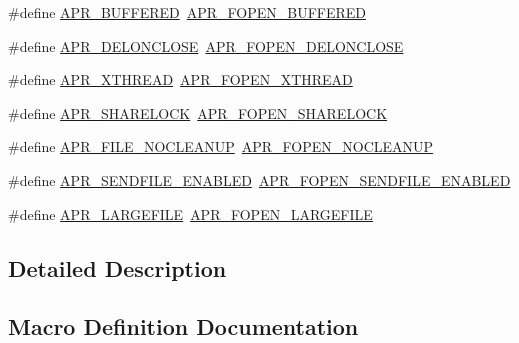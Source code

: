 \begin{DoxyCompactItemize}
\item 
\#define \hyperlink{group__apr__file__open__flags_ga6edc818199e8b90e3dabf97c42a27158}{A\+P\+R\+\_\+\+B\+U\+F\+F\+E\+R\+ED}~\hyperlink{group__apr__file__open__flags_gac48fd4c853c9f561632a2e8aaf5d8d97}{A\+P\+R\+\_\+\+F\+O\+P\+E\+N\+\_\+\+B\+U\+F\+F\+E\+R\+ED}
\item 
\#define \hyperlink{group__apr__file__open__flags_gaebc7f034a72dffe64858b1b9451994ff}{A\+P\+R\+\_\+\+D\+E\+L\+O\+N\+C\+L\+O\+SE}~\hyperlink{group__apr__file__open__flags_ga5d3756f6d242c667ed1d3f54af4916eb}{A\+P\+R\+\_\+\+F\+O\+P\+E\+N\+\_\+\+D\+E\+L\+O\+N\+C\+L\+O\+SE}
\item 
\#define \hyperlink{group__apr__file__open__flags_gaa9120c0e395d8a0e640b5eafa8f11cce}{A\+P\+R\+\_\+\+X\+T\+H\+R\+E\+AD}~\hyperlink{group__apr__file__open__flags_ga435cd9b2604b11796779c23ffa00a3dd}{A\+P\+R\+\_\+\+F\+O\+P\+E\+N\+\_\+\+X\+T\+H\+R\+E\+AD}
\item 
\#define \hyperlink{group__apr__file__open__flags_ga41277154f4f754a22287ed90e9466811}{A\+P\+R\+\_\+\+S\+H\+A\+R\+E\+L\+O\+CK}~\hyperlink{group__apr__file__open__flags_ga426f6e2a8457ab410d99248269059a18}{A\+P\+R\+\_\+\+F\+O\+P\+E\+N\+\_\+\+S\+H\+A\+R\+E\+L\+O\+CK}
\item 
\#define \hyperlink{group__apr__file__open__flags_ga3ef1061dbb3adf595701bd12edb062f9}{A\+P\+R\+\_\+\+F\+I\+L\+E\+\_\+\+N\+O\+C\+L\+E\+A\+N\+UP}~\hyperlink{group__apr__file__open__flags_ga3fc9b5a7791d9f462997cd29de67eb80}{A\+P\+R\+\_\+\+F\+O\+P\+E\+N\+\_\+\+N\+O\+C\+L\+E\+A\+N\+UP}
\item 
\#define \hyperlink{group__apr__file__open__flags_ga17e216aadb23254580258889e10c53f3}{A\+P\+R\+\_\+\+S\+E\+N\+D\+F\+I\+L\+E\+\_\+\+E\+N\+A\+B\+L\+ED}~\hyperlink{group__apr__file__open__flags_ga60c21e28e4a612d58a874fe2cc71a6e4}{A\+P\+R\+\_\+\+F\+O\+P\+E\+N\+\_\+\+S\+E\+N\+D\+F\+I\+L\+E\+\_\+\+E\+N\+A\+B\+L\+ED}
\item 
\#define \hyperlink{group__apr__file__open__flags_gaafa04fd4ec71910a5d7af1c7f5596bad}{A\+P\+R\+\_\+\+L\+A\+R\+G\+E\+F\+I\+LE}~\hyperlink{group__apr__file__open__flags_gaf6cfaa4789e6264afd186235f0adbc22}{A\+P\+R\+\_\+\+F\+O\+P\+E\+N\+\_\+\+L\+A\+R\+G\+E\+F\+I\+LE}
\end{DoxyCompactItemize}


\subsection{Detailed Description}


\subsection{Macro Definition Documentation}
